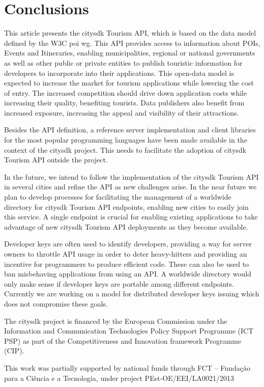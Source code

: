 \documentclass[times,doublespace]{ettauth}%
\begin{document}
\section{Conclusions}
\label{s:conclusions}
This article presents the \ac{citysdk} Tourism API, which is based on the data model defined by the \ac{W3C} \ac{poi} \ac{wg}.
This API provides access to information about \ac{POIs}, Events and Itineraries, enabling municipalities, regional or national governments as well as other public or private entities to publish touristic information for developers to incorporate into their applications.
This open-data model is expected to increase the market for tourism applications while lowering the cost of entry.
The increased competition should drive down application costs while increasing their quality, benefiting tourists.
Data publishers also benefit from increased exposure, increasing the appeal and visibility of their attractions.

Besides the API definition, a reference server implementation and client libraries for the most popular programming languages have been made available in the context of the \ac{citysdk} project.
This needs to facilitate the adoption of \ac{citysdk} Tourism API outside the project.

In the future, we intend to follow the implementation of the \ac{citysdk} Tourism API in several cities and refine the API as new challenges arise.
In the near future we plan to develop processes for facilitating the management of a worldwide directory for \ac{citysdk} Tourism API endpoints, enabling new cities to easily join this service.
A single endpoint is crucial for enabling existing applications to take advantage of new \ac{citysdk} Tourism API deployments as they become available.

Developer keys are often used to identify developers, providing a way for server owners to throttle API usage in order to deter heavy-hitters and providing an incentive for programmers to produce efficient code.
These can also be used to ban misbehaving applications from using an API.
A worldwide directory would only make sense if developer keys are portable among different endpoints.
Currently we are working on a model for distributed developer keys issuing which does not compromise these goals.


\acks
The \ac{citysdk} project is financed by the European Commission under the Information and Communication Technologies Policy Support Programme (ICT PSP) as part of the Competitiveness and Innovation framework Programme (CIP).

This work was partially supported by national funds through FCT – Funda\c c\~ao para a Ci\^encia e a Tecnologia, under project PEst-OE/EEI/LA0021/2013



\end{document}
